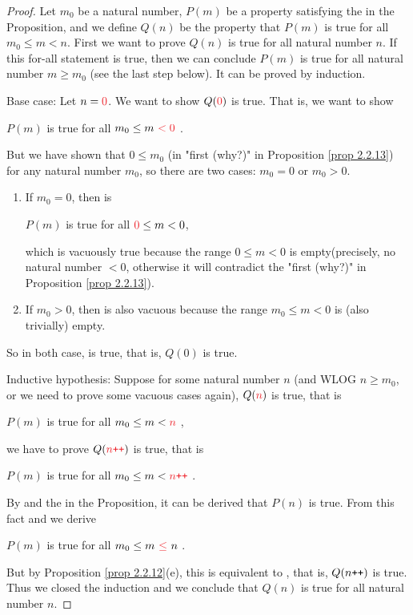 \begin{proof}
Let \(m_0\) be a natural number, \(P(m)\) be a property satisfying the  in the Proposition, and we define \(Q(n)\) be the property that \(P(m)\) is true for all \(m_0 \leq m < n\). First we want to prove \(Q(n)\) is true for all natural number \(n\). If this for-all statement is true, then we can conclude \(P(m)\) is true for all natural number \(m \geq m_0\) (see the last step below). It can be proved by induction.

Base case: Let \(n = \RED{0}\). We want to show \(Q(\RED{0})\) is true. That is, we want to show
\begin{center}
    \(P(m)\) is true for all \(m_0 \leq m\ \RED{< 0}\) .
\end{center}
But we have shown that \(0 \leq m_0\) (in "first (why?)" in Proposition \ref{prop 2.2.13}) for any natural number \(m_0\), so there are two cases: \(m_0 = 0\) or \(m_0 > 0\).
\begin{enumerate}
    \item If \(m_0 = 0\), then  is
        \begin{center}
            \(P(m)\) is true for all \(\RED{0} \leq m < 0\),
        \end{center}
        which is vacuously true because the range \(0 \leq m < 0\) is empty(precisely, no natural number \(< 0\), otherwise it will contradict the "first (why?)" in Proposition \ref{prop 2.2.13}).
    \item If \(m_0 > 0\), then  is also vacuous because the range \(m_0 \leq m < 0\) is (also trivially) empty.
\end{enumerate}
So in both case,  is true, that is, \(Q(0)\) is true.

Inductive hypothesis: Suppose for some natural number \(n\) (and WLOG \(n \geq m_0\), or we need to prove some vacuous cases again), \(Q(\RED{n})\) is true, that is
\begin{center}
    \(P(m)\) is true for all \(m_0 \leq m < \RED{n}\) ,
\end{center}
we have to prove \(Q(\RED{n\INC})\) is true, that is
\begin{center}
    \(P(m)\) is true for all \(m_0 \leq m < \RED{n\INC}\) .
\end{center}
By  and the  in the Proposition, it can be derived that \(P(n)\) is true. From this fact and  we derive
\begin{center}
    \(P(m)\) is true for all \(m_0 \leq m\ \RED{\leq}\ n\) .
\end{center}
But by Proposition \ref{prop 2.2.12}(e), this is equivalent to , that is, \(Q(n\texttt{++})\) is true. Thus we closed the induction and we conclude that \(Q(n)\) is true for all natural number \(n\).


\end{proof}

